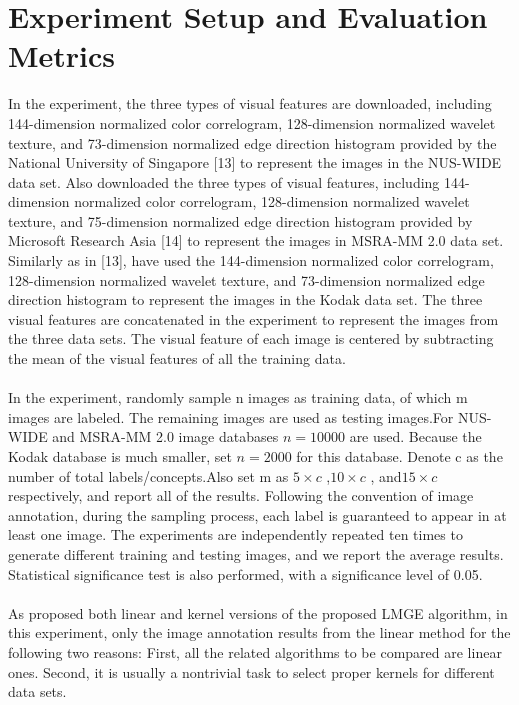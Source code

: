 \documentclass[a4paper,11pt]{report}
\begin{document}
\section{Experiment Setup and Evaluation Metrics}

In the experiment,  the three types of
visual features are downloaded, including 144-dimension normalized color
correlogram, 128-dimension normalized wavelet texture, and
73-dimension normalized edge direction histogram provided
by the National University of Singapore [13] to represent the
images in the NUS-WIDE data set. Also downloaded the
three types of visual features, including 144-dimension normalized
color correlogram, 128-dimension normalized wavelet
texture, and 75-dimension normalized edge direction histogram
provided by Microsoft Research Asia [14] to represent the
images in MSRA-MM 2.0 data set. Similarly as in [13], 
have used the 144-dimension normalized color correlogram,
128-dimension normalized wavelet texture, and 73-dimension
normalized edge direction histogram to represent the images in
the Kodak data set. The three visual features are  concatenated in
the experiment to represent the images from the three data sets.
The visual feature of each image is centered by subtracting the
mean of the visual features of all the training data.
\paragraph{}
In the experiment, randomly sample n images as training
data, of which m images are labeled. The remaining images are
used as testing images.For   NUS-WIDE
and MSRA-MM 2.0 image databases $n=10000$ are used. Because the Kodak database
is much smaller,  set $n=2000$ for this database. Denote c
as the number of total labels/concepts.Also set m as $5\times c$ ,$10\times c$ 
, and$15\times c$   respectively, and report all of the results. Following
the convention of image annotation, during the sampling
process, each label is guaranteed to appear in at least one image.
The experiments are independently repeated ten times to generate
different training and testing images, and we report the average
results. Statistical significance test is also performed, with
a significance level of 0.05.
\paragraph{}
As   proposed both linear and kernel versions of
the proposed LMGE algorithm, in this experiment,   only
the image annotation results from the linear method for the following
two reasons: First, all the related algorithms to be compared
are linear ones. Second, it is usually a nontrivial task to
select proper kernels for different data sets.
\end{document}
